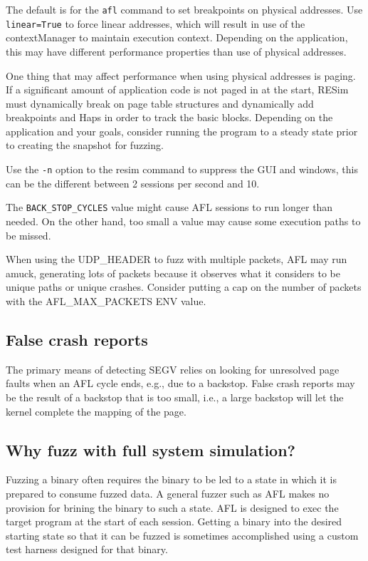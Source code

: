 \documentclass[titlepage]{article}
\begin{document}
The default is for the {\tt afl} command to set breakpoints on physical addresses.  Use {\tt linear=True} to force linear addresses, which will
result in use of the contextManager to maintain execution context.  Depending on the application, this may have different performance properties than 
use of physical addresses.  

One thing that may affect performance when using physical addresses is paging. If a significant amount of application code is not paged in at the
start, RESim must dynamically break on page table structures and dynamically add breakpoints and Haps in order to track the basic blocks.  Depending on
the  application and your goals, consider running the program to a steady state prior to creating the snapshot for fuzzing.

Use the {\tt -n} option to the resim command to suppress the GUI and windows, this can be the different between 2 sessions per second and 10.

The {\tt BACK\_STOP\_CYCLES} value might cause AFL sessions to run longer than needed.  On the other hand, too small a value may cause some
execution paths to be missed.

When using the UDP\_HEADER to fuzz with multiple packets, AFL may run amuck, generating lots of packets because it observes what it considers
to be unique paths or unique crashes.  Consider putting a cap on the number of packets with the AFL\_MAX\_PACKETS ENV value. 

\subsection{False crash reports}
The primary means of detecting SEGV relies on looking for unresolved page faults when an AFL cycle ends, e.g., due to a backstop.
False crash reports may be the result of a backstop that is too small, i.e., a large backstop will let the kernel complete the
mapping of the page.

\subsection{Why fuzz with full system simulation?}
Fuzzing a binary often requires the binary to be led to a state in which it is prepared
to consume fuzzed data. A general fuzzer such as AFL makes no provision for brining the 
binary to such a state.  AFL is designed to exec the target program at the start of each
session.  Getting a binary into the desired starting state so that it can be fuzzed is
sometimes accomplished using a custom test harness designed for that binary.
\end{document}
